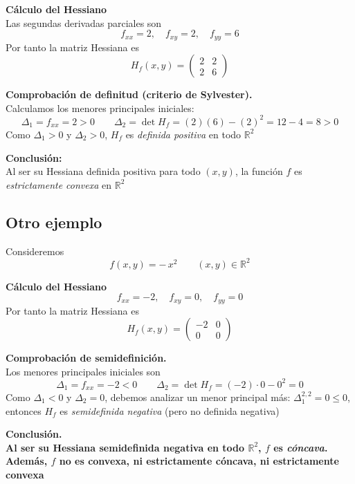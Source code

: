 \documentclass{article}
\newcommand{\R}{\ensuremath{\mathbb{R}}}
\begin{document}
\medskip

\noindent\textbf{Cálculo del Hessiano}\\
Las segundas derivadas parciales son
\[
f_{xx} = 2,\quad
f_{xy} = 2,\quad
f_{yy} = 6
\]
Por tanto la matriz Hessiana es
\[
H_f(x,y)
=\begin{pmatrix}
2 & 2\\[4pt]
2 & 6
\end{pmatrix}
\]

\medskip

\noindent\textbf{Comprobación de definitud (criterio de Sylvester).}\\
Calculamos los menores principales iniciales:
\[
\Delta_1 = f_{xx} = 2 > 0
\qquad
\Delta_2 = \det H_f = (2)(6) - (2)^2 = 12 - 4 = 8 > 0
\]
Como \(\Delta_1>0\) y \(\Delta_2>0\), \(H_f\) es \emph{definida positiva} en todo \(\R^2\)

\medskip

\noindent\textbf{Conclusión:}\\
{\color{teal}Al ser su Hessiana definida positiva para todo \((x,y)\), la función \(f\) es \emph{estrictamente convexa} en \(\R^2\)}

\subsection*{Otro ejemplo}

Consideremos 
\[
f(x,y) = -\,x^2
\qquad (x,y)\in\R^2
\]

\medskip
\noindent\textbf{Cálculo del Hessiano}\\
\[
f_{xx} = -2,\quad
f_{xy} = 0,\quad
f_{yy} = 0
\]
Por tanto la matriz Hessiana es
\[
H_f(x,y) = 
\begin{pmatrix}
-2 & 0\\[4pt]
0  & 0
\end{pmatrix}
\]

\medskip
\noindent\textbf{Comprobación de semidefinición.}\\
Los menores principales iniciales son
\[
\Delta_1 = f_{xx} = -2 < 0
\qquad
\Delta_2 = \det H_f = (-2)\cdot0 - 0^2 = 0
\]
Como \(\Delta_1<0\) y \(\Delta_2=0\), debemos analizar un menor principal más: \(\Delta_1^{2,2}=0\leq0\), entonces \(H_f\) es \emph{semidefinida negativa} (pero no definida negativa)

\medskip
\noindent\textbf{Conclusión.}\\
\textbf{\color{teal}Al ser su Hessiana semidefinida negativa en todo \(\R^2\), \(f\) es \emph{cóncava}.  
Además, \(f\) no es convexa, ni estrictamente cóncava, ni estrictamente convexa}
\end{document}
